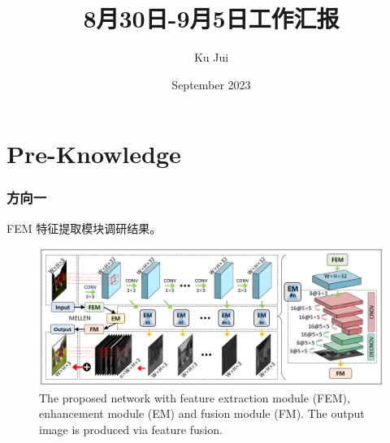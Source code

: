 \documentclass[letterpaper,10pt]{article}
\begin{document}
	
	
	\title{\songti {}8月30日-9月5日工作汇报}
	\author{\textrm{Ku Jui}}
	\date{\textrm{September 2023}}
	\maketitle
	
	\renewcommand{\figurename}{Figure} %
	\renewcommand{\contentsname}{Contents}
	\renewcommand{\tablename}{Table}
	\tableofcontents  %
	
	\part{Pre-Knowledge}	

	\section{方向一}
	
		FEM 特征提取模块调研结果。
		
		\begin{figure}[htbp]
			\centering 
			\includegraphics[width=\columnwidth]{picture/LLIE/MBLLEN Architecture}
			\caption{
				\label{fig: MBLLEN Architecture} 
				The proposed network with feature extraction module (FEM), enhancement module (EM) and fusion module (FM). The output image is produced via feature fusion.
			}
		\end{figure}
\end{document}
